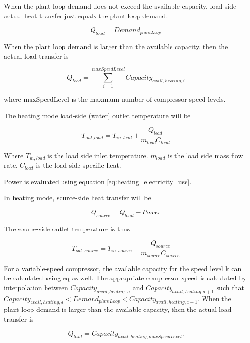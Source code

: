 When the plant loop demand does not exceed the available capacity, load-side
actual heat transfer just equals the plant loop demand.

\begin{equation}
Q_{load} = Demand_{plantLoop} 
\end{equation}

When the plant loop demand is larger than the available capacity, then the
actual load transfer is

\begin{equation}
Q_{load} = \sum_{i=1}^{maxSpeedLevel} Capacity_{avail,heating,i} 
\end{equation}

where maxSpeedLevel is the maximum number of compressor speed levels.

The heating mode load-side (water) outlet temperature will be 

\begin{equation}
T_{out,load} = T_{in,load} + \frac{Q_{load}}{m_{load}C_{load}} 
\end{equation}

Where $T_{in,load}$ is the load side inlet temperature. $m_{load}$ is the load
side mass flow rate. $C_{load}$ is the load-side specific heat.

Power is evaluated using equation \ref{eq:heating_electricity_use}. 

In heating mode, source-side heat transfer will be

\begin{equation}
Q_{source} = Q_{load} - Power 
\end{equation}

The source-side outlet temperature is thus

\begin{equation}
T_{out,source} = T_{in,source} - \frac{Q_{source}}{m_{source}C_{source}} 
\end{equation}

For a variable-speed compressor, the available capacity for the speed level k
can be calculated using eq as well. The appropriate compressor speed is
calculated by interpolation between $Capacity_{avail,heating,a}$ and
$Capacity_{avail,heating,a+1}$ such that $Capacity_{avail,heating,a} <
Demand_{plantLoop} < Capacity_{avail,heating,a+1}$. When the plant loop demand
is larger than the available capacity, then the actual load transfer is

\begin{equation}
Q_{load} = Capacity_{avail,heating,maxSpeedLevel} . 
\end{equation}

